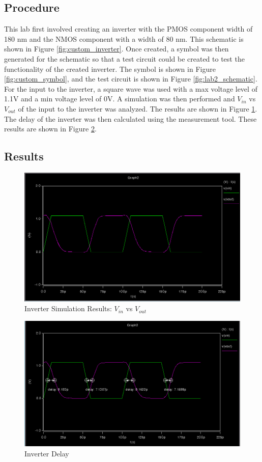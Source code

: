 \documentclass[12pt]{article}
\begin{document}
\subsection{Procedure}
This lab first involved creating an inverter with the PMOS component width of 180 nm and the NMOS component with a width of 80 nm. This schematic is shown in Figure \ref{fig:custom_inverter}. Once created, a symbol was then generated for the schematic so that a test circuit could be created to test the functionality of the created inverter. The symbol is shown in Figure \ref{fig:custom_symbol}, and the test circuit is shown in Figure \ref{fig:lab2_schematic}. For the input to the inverter, a square wave was used with a max voltage level of 1.1V and a min voltage level of 0V. A simulation was then performed and $V_{in}$ vs $V_{out}$ of the input to the inverter was analyzed. The results are shown in Figure \ref{fig:graph}. The delay of the inverter was then calculated using the measurement tool. These results are shown in Figure \ref{fig:delay}.

\subsection{Results}
\begin{figure}[H]
\centering
\includegraphics[width=0.7\linewidth]{graph}
\caption{Inverter Simulation Results: $V_{in}$ vs $V_{out}$}
\label{fig:graph}
\end{figure}

\begin{figure}[H]
\centering
\includegraphics[width=0.7\linewidth]{delay}
\caption{Inverter Delay}
\label{fig:delay}
\end{figure}
\end{document}
